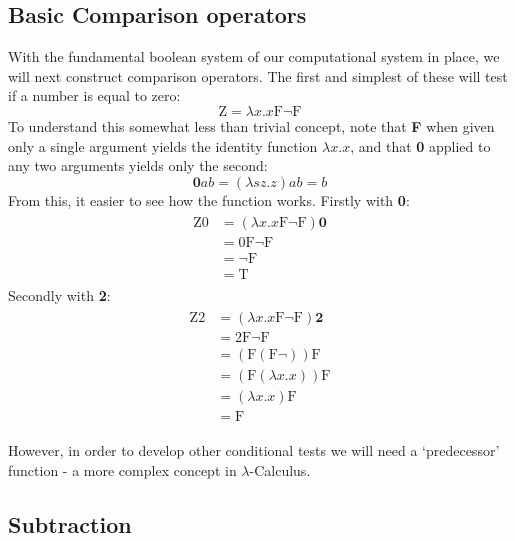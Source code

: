 \documentclass[Master.tex]{subfiles}
\begin{document}
\subsection{Basic Comparison operators}

With the fundamental boolean system of our computational system in place, we will next construct comparison operators. The first and simplest of these will test if a number is equal to zero:
\cite{rojas2015lambdatutorial}
\begin{equation*}
\bm{\mathrm{Z}} = \lambda x.x\bm{\mathrm{F\lnot F}}
\end{equation*}
To understand this somewhat less than trivial concept, note that \textbf{F} when given only a single argument yields the identity function $\lambda x.x$, and that \textbf{0} applied to any two arguments yields only the second:
\cite{rojas2015lambdatutorial}
\begin{equation*}
\bm{0}ab = (\lambda sz.z)ab = b
\end{equation*}
From this, it easier to see how the function works. Firstly with \textbf{0}:
\cite{rojas2015lambdatutorial}
\begin{gather*}
\begin{aligned}
\bm{\mathrm{Z0}} &= (\lambda x.x\bm{\mathrm{F\lnot F}})\bm{0}\\
&= \bm{\mathrm{0F\lnot F}}\\
&= \bm{\mathrm{\lnot F}}\\
&= \bm{\mathrm{T}}
\end{aligned}
\end{gather*}
Secondly with \textbf{2}:
\begin{gather*}
\begin{aligned}
\bm{\mathrm{Z2}} &= (\lambda x.x\bm{\mathrm{F\lnot F}})\bm{2}\\
&= \bm{\mathrm{2F\lnot F}}\\
&= (\bm{\mathrm{F}}(\bm{\mathrm{F}}\lnot)) \bm{\mathrm{F}}\\
&= (\bm{\mathrm{F}}(\lambda x.x))\bm{\mathrm{F}}\\
&= (\lambda x.x)\bm{\mathrm{F}}\\
&= \bm{\mathrm{F}} 
\end{aligned}
\end{gather*}

However, in order to develop other conditional tests we will need a `predecessor' function - a more complex concept in $\lambda$-Calculus.
\subsection{Subtraction}
\end{document}
